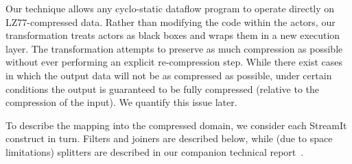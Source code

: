 Our technique allows any cyclo-static dataflow program to operate
directly on LZ77-compressed data.  Rather than modifying the code
within the actors, our transformation treats actors as black boxes and
wraps them in a new execution layer.  The transformation attempts to
preserve as much compression as possible without ever performing an
explicit re-compression step.  While there exist cases in which the
output data will not be as compressed as possible, under certain
conditions the output is guaranteed to be fully compressed (relative
to the compression of the input).  We quantify this issue later.

To describe the mapping into the compressed domain, we consider each
StreamIt construct in turn.  Filters and joiners are described below,
while (due to space limitations) splitters are described in our
companion technical report~\cite{techreport}.


